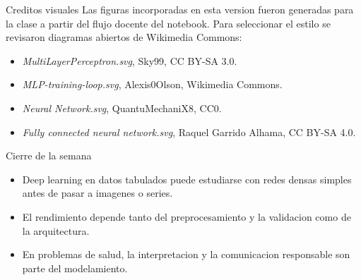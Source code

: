 \begin{frame}{Creditos visuales}
\small
Las figuras incorporadas en esta version fueron generadas para la clase a partir del flujo docente del notebook. Para seleccionar el estilo se revisaron diagramas abiertos de Wikimedia Commons:
\begin{itemize}
    \item \textit{MultiLayerPerceptron.svg}, Sky99, CC BY-SA 3.0.
    \item \textit{MLP-training-loop.svg}, Alexis0Olson, Wikimedia Commons.
    \item \textit{Neural Network.svg}, QuantuMechaniX8, CC0.
    \item \textit{Fully connected neural network.svg}, Raquel Garrido Alhama, CC BY-SA 4.0.
\end{itemize}
\end{frame}

\begin{frame}{Cierre de la semana}
\begin{itemize}
    \item Deep learning en datos tabulados puede estudiarse con redes densas simples antes de pasar a imagenes o series.
    \item El rendimiento depende tanto del preprocesamiento y la validacion como de la arquitectura.
    \item En problemas de salud, la interpretacion y la comunicacion responsable son parte del modelamiento.
\end{itemize}
\end{frame}


